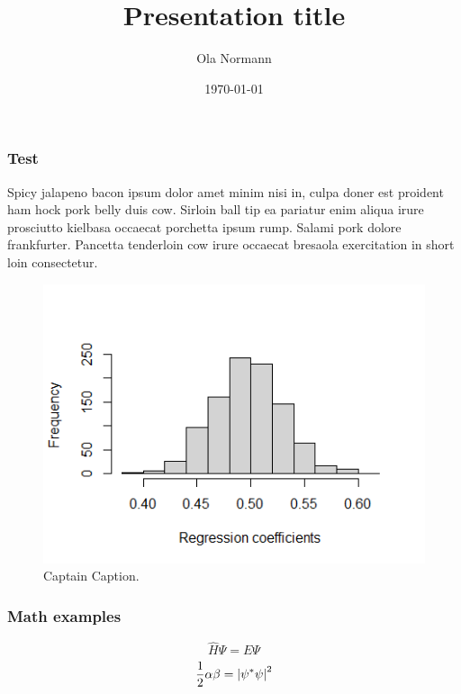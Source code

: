 \documentclass[aspectratio=43,xcolor={rgb}]{beamer}
\title{Presentation title}
\date{\today}
\author{Ola Normann}
\begin{document}
\setcounter{page}{1}
\begin{frame}
  \titlepage
\end{frame}

\setcounter{page}{2}
\begin{frame}
  \titlepage
\end{frame}

\setcounter{page}{3}
\setcounter{framenumber}{0}
\begin{frame}
  \frametitle{Test}
  Spicy jalapeno bacon ipsum dolor amet minim nisi in, culpa doner est
  proident ham hock pork belly duis cow. Sirloin ball tip ea pariatur
  enim aliqua irure prosciutto kielbasa occaecat porchetta ipsum
  rump. Salami pork dolore frankfurter. Pancetta tenderloin cow irure
  occaecat bresaola exercitation in short loin consectetur.
  \begin{figure}[tpbh]
    \centering
    \includegraphics[scale=0.4]{effect of interaction.png}
    \caption{Captain Caption.}
  \end{figure}
\end{frame}

\begin{frame}
  \frametitle{Math examples}
  \begin{equation}
    \hat{H}\Psi = E\Psi
  \end{equation}
  \begin{equation}
    \frac{1}{2}\alpha\beta = \qty|\psi^*\psi|^2
  \end{equation}
\end{frame}
\end{document}

